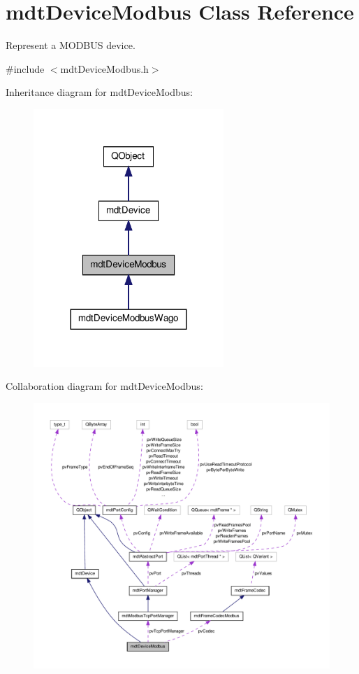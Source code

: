 \hypertarget{classmdt_device_modbus}{\section{mdt\-Device\-Modbus Class Reference}
\label{classmdt_device_modbus}
}


Represent a M\-O\-D\-B\-U\-S device.  




{\ttfamily \#include $<$mdt\-Device\-Modbus.\-h$>$}



Inheritance diagram for mdt\-Device\-Modbus\-:
\nopagebreak
\begin{figure}[H]
\begin{center}
\leavevmode
\includegraphics[width=204pt]{classmdt_device_modbus__inherit__graph}
\end{center}
\end{figure}


Collaboration diagram for mdt\-Device\-Modbus\-:
\nopagebreak
\begin{figure}[H]
\begin{center}
\leavevmode
\includegraphics[width=350pt]{classmdt_device_modbus__coll__graph}
\end{center}
\end{figure}
